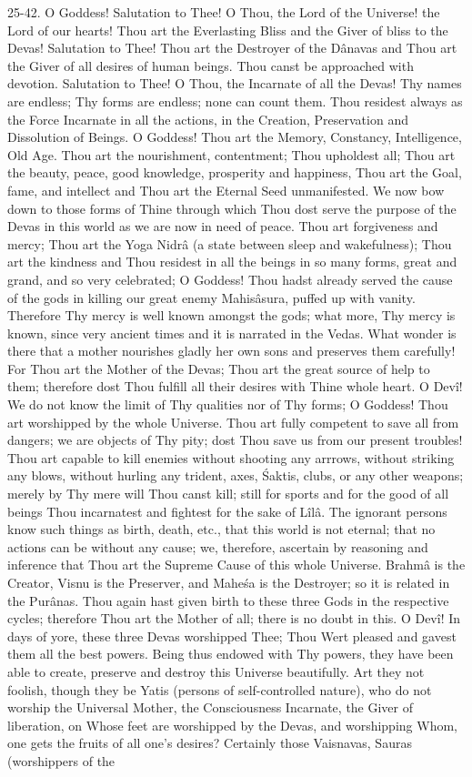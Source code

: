 25-42. O Goddess! Salutation to Thee! O Thou, the Lord of the Universe! the Lord of our hearts! Thou art the Everlasting Bliss and the Giver of bliss to the Devas! Salutation to Thee! Thou art the Destroyer of the D\^anavas and Thou art the Giver of all desires of human beings. Thou canst be approached with devotion. Salutation to Thee! O Thou, the Incarnate of all the Devas! Thy names are endless; Thy forms are endless; none can count them. Thou residest always as the Force Incarnate in all the actions, in the Creation, Preservation and Dissolution of Beings. O Goddess! Thou art the Memory, Constancy, Intelligence, Old Age. Thou art the nourishment, contentment; Thou upholdest all; Thou art the beauty, peace, good knowledge, prosperity and happiness, Thou art the Goal, fame, and intellect and Thou art the Eternal Seed unmanifested. We now bow down to those forms of Thine through which Thou dost serve the purpose of the Devas in this world as we are now in need of peace. Thou art forgiveness and mercy; Thou art the Yoga Nidr\^a (a state between sleep and wakefulness); Thou art the kindness and Thou residest in all the beings in so many forms, great and grand, and so very celebrated; O Goddess! Thou hadst already served the cause of the gods in killing our great enemy Mahis\^asura, puffed up with vanity. Therefore Thy mercy is well known amongst the gods; what more, Thy mercy is known, since very ancient times and it is narrated in the Vedas. What wonder is there that a mother nourishes gladly her own sons and preserves them carefully! For Thou art the Mother of the Devas; Thou art the great source of help to them; therefore dost Thou fulfill all their desires with Thine whole heart. O Dev\^i! We do not know the limit of Thy qualities nor of Thy forms; O Goddess! Thou art worshipped by the whole Universe. Thou art fully competent to save all from dangers; we are objects of Thy pity; dost Thou save us from our present troubles! Thou art capable to kill enemies without shooting any arrrows, without striking any blows, without hurling any trident, axes, \'Saktis, clubs, or any other weapons; merely by Thy mere will Thou canst kill; still for sports and for the good of all beings Thou incarnatest and fightest for the sake of L\^il\^a. The ignorant persons know such things as birth, death, etc., that this world is not eternal; that no actions can be without any cause; we, therefore, ascertain by reasoning and inference that Thou art the Supreme Cause of this whole Universe. Brahm\^a is the Creator, Visnu is the Preserver, and Mahe\'sa is the Destroyer; so it is related in the Pur\^anas. Thou again hast given birth to these three Gods in the respective cycles; therefore Thou art the Mother of all; there is no doubt in this. O Dev\^i! In days of yore, these three Devas worshipped Thee; Thou Wert pleased and gavest them all the best powers. Being thus endowed with Thy powers, they have been able to create, preserve and destroy this Universe beautifully. Art they not foolish, though they be Yatis (persons of self-controlled nature), who do not worship the Universal Mother, the Consciousness Incarnate, the Giver of liberation, on Whose feet are worshipped by the Devas, and worshipping Whom, one gets the fruits of all one's desires? Certainly those Vaisnavas, Sauras (worshippers of the 